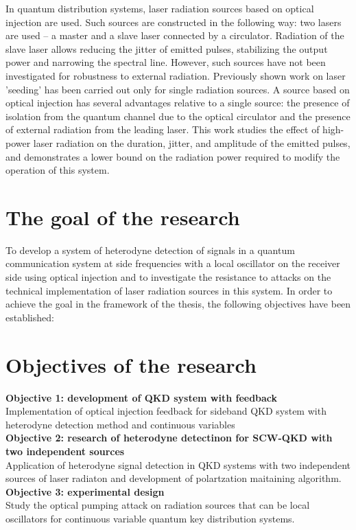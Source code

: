 In quantum distribution systems, laser radiation sources based on optical injection are used. Such sources are constructed in the following way: two lasers are used -- a master and a slave laser connected by a circulator. Radiation of the slave laser allows reducing the jitter of emitted pulses, stabilizing the output power and narrowing the spectral line. However, such sources have not been investigated for robustness to external radiation. Previously shown work on laser 'seeding' has been carried out only for single radiation sources. A source based on optical injection has several advantages relative to a single source: the presence of isolation from the quantum channel due to the optical circulator and the presence of external radiation from the leading laser. This work studies the effect of high-power laser radiation on the duration, jitter, and amplitude of the emitted pulses, and demonstrates a lower bound on the radiation power required to modify the operation of this system.

\section*{The goal of the research}

To develop a system of heterodyne detection of signals in a quantum communication system at side frequencies with a local oscillator on the receiver side using optical injection and to investigate the resistance to attacks on the technical implementation of laser radiation sources in this system.
In order to achieve the goal in the framework of the thesis, the following objectives have been established:
\section*{Objectives of the research}
\textbf{Objective 1: development of QKD system with feedback}\\
Implementation of optical injection feedback for sideband QKD system with heterodyne detection method and continuous variables\\

\textbf{Objective 2: research of heterodyne detectinon for SCW-QKD with two independent sources} \\
Application of heterodyne signal detection in QKD systems with two independent sources of laser radiaton and development of polartzation maitaining algorithm.\\

\textbf{Objective 3: experimental design}\\
Study the optical pumping attack on radiation sources that can be local oscillators for continuous variable quantum key distribution systems.\\

